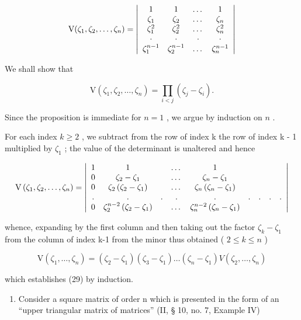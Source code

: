 \[
\mathrm{V} (\zeta_ {1}, \zeta_ {2}, \dots , \zeta_ {n}) = \left| \begin{array}{c c c c} 1 & 1 & \dots & 1 \\ \zeta_ {1} & \zeta_ {2} & \dots & \zeta_ {n} \\ \zeta_ {1} ^ {2} & \zeta_ {2} ^ {2} & \dots & \zeta_ {n} ^ {2} \\ \cdot & \cdot & \cdot & \cdot \\ \zeta_ {1} ^ {n - 1} & \zeta_ {2} ^ {n - 1} & \dots & \zeta_ {n} ^ {n - 1} \end{array} \right|
\]

We shall show that

\[
\mathrm{V} \left(\zeta_ {1}, \zeta_ {2}, \dots , \zeta_ {n}\right) = \prod_ {i <   j} \left(\zeta_ {j} - \zeta_ {i}\right).\tag{29}
\]

Since the proposition is immediate for \(n = 1\) , we argue by induction on \(n\) .

For each index \(k \geqslant 2\) , we subtract from the row of index k the row of index k - 1 multiplied by \(\zeta_{1}\) ; the value of the determinant is unaltered and hence

\[
\mathrm{V} \left(\zeta_ {1}, \zeta_ {2}, \dots , \zeta_ {n}\right) = \left| \begin{array}{c c c c c c c c c} 1 & 1 & & \dots & 1 \\ 0 & \zeta_ {2} - \zeta_ {1} & & \dots & \zeta_ {n} - \zeta_ {1} \\ 0 & \zeta_ {2} \left(\zeta_ {2} - \zeta_ {1}\right) & & \dots & \zeta_ {n} \left(\zeta_ {n} - \zeta_ {1}\right) \\ . & . & . & . & . & . & . & . & . \\ 0 & \zeta_ {2} ^ {n - 2} \left(\zeta_ {2} - \zeta_ {1}\right) & & \dots & \zeta_ {n} ^ {n - 2} \left(\zeta_ {n} - \zeta_ {1}\right) \end{array} \right|
\]

whence, expanding by the first column and then taking out the factor \(\zeta_{k}-\zeta_{1}\) from the column of index k-1 from the minor thus obtained ( \(2\leqslant k\leqslant n\) )

\[
\mathrm{V} \left(\zeta_ {1}, \dots , \zeta_ {n}\right) = \left(\zeta_ {2} - \zeta_ {1}\right) \left(\zeta_ {3} - \zeta_ {1}\right) \dots \left(\zeta_ {n} - \zeta_ {1}\right) V \left(\zeta_ {2}, \dots , \zeta_ {n}\right)
\]

which establishes (29) by induction.

\begin{enumerate}
\def\labelenumi{(\arabic{enumi})}
\setcounter{enumi}{1}
\tightlist
\item
  Consider a square matrix of order n which is presented in the form of an ``upper triangular matrix of matrices'' (II, § 10, no. 7, Example IV)
\end{enumerate}

